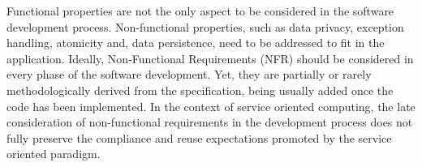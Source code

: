 \documentclass[12pt,twoside]{article}
\theoremstyle{plain}
\theoremstyle{plain}
\begin{document}
\begin{multicols}{2}
Functional properties are not the only aspect to be considered in the software development process.
Non-functional properties, such as data privacy, exception handling, atomicity  and, data persistence, need to be addressed to fit in the application.
%
Ideally, Non-Functional Requirements (NFR) should be considered in every phase of the software development.
Yet, they are partially or rarely methodologically derived from the specification, being usually added once the code has been im\-ple\-men\-ted.
In the context of service oriented computing, the late consideration of non-functional requirements in the development process does not fully preserve the compliance and re\-use expectations promoted by the service oriented paradigm.








\end{multicols}
\end{document}
